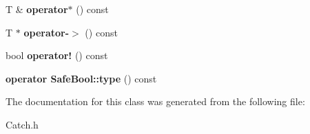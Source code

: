 \begin{DoxyCompactItemize}
\item 
\hypertarget{class_catch_1_1_ptr_a3a4c139032a8bd1bffa553103d5dbfd3}{T \& {\bfseries operator$\ast$} () const }\label{class_catch_1_1_ptr_a3a4c139032a8bd1bffa553103d5dbfd3}

\item 
\hypertarget{class_catch_1_1_ptr_afaa13250d5e0ae5a440726d5e5aa7295}{T $\ast$ {\bfseries operator-\/$>$} () const }\label{class_catch_1_1_ptr_afaa13250d5e0ae5a440726d5e5aa7295}

\item 
\hypertarget{class_catch_1_1_ptr_aea1a99ded6d62423ccb9173fab91b56e}{bool {\bfseries operator!} () const }\label{class_catch_1_1_ptr_aea1a99ded6d62423ccb9173fab91b56e}

\item 
\hypertarget{class_catch_1_1_ptr_a27234c04feec43ffe0fd08e045557448}{{\bfseries operator Safe\-Bool\-::type} () const }\label{class_catch_1_1_ptr_a27234c04feec43ffe0fd08e045557448}

\end{DoxyCompactItemize}


The documentation for this class was generated from the following file\-:\begin{DoxyCompactItemize}
\item 
Catch.\-h\end{DoxyCompactItemize}
